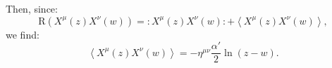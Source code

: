 \documentclass[10pt,a4paper]{article}
\begin{document}
    Then, since:
    \begin{equation*}
        \mathrm{R}\left( X^{\mu}\left( z \right) X^{\nu}\left( w \right)
        \right) = \colon X^{\mu}\left( z \right) X^{\nu}\left( w \right) \colon
        + \left\langle X^{\mu}\left( z \right) X^{\nu}\left( w \right)
        \right\rangle,
    \end{equation*}
    we find:
    \begin{equation*}
        \left\langle X^{\mu}\left( z \right) X^{\nu}\left( w \right)
        \right\rangle = - \eta^{\mu\nu} \frac{\alpha'}{2} \ln\left( z - w
        \right).
    \end{equation*}
\end{document}
